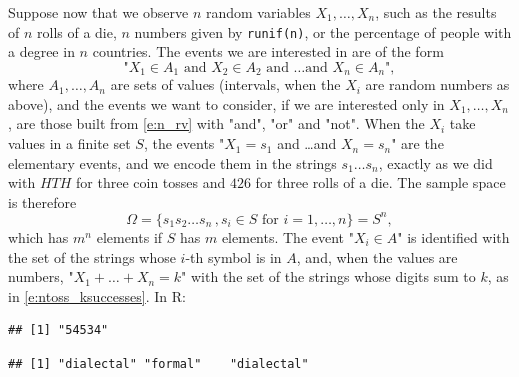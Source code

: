 \begin{model}
	\label{ex:n_rv}
	Suppose now that we observe $n$ random variables $X_1, \ldots, X_n$, such as the results of $n$ rolls of a die, $n$ numbers given by \texttt{runif(n)}, or the percentage of people with a degree in $n$ countries. The events we are interested in are of the form 
	\begin{equation}
		\label{e:n_rv}
		\text{"$X_1 \in A_1$ and $X_2 \in A_2$ and \ldots and $X_n \in A_n$"}, 
	\end{equation}
	where $A_1, \ldots, A_n$ are sets of values (intervals, when the $X_i$ are random numbers as above), and the events we want to consider, if we are interested only in $X_1, \ldots, X_n$, are those built from \eqref{e:n_rv} with "and", "or" and "not". 
	When the $X_i$ take values in a finite set $S$, the events "$X_1 = s_1$ and \ldots and $X_n = s_n$" are the elementary events, and we encode them in the strings $s_1 \ldots s_n$, exactly as we did with $HTH$ for three coin tosses and $426$ for three rolls of a die. The sample space is therefore 
	\begin{equation}
		\label{e:n_rv_strings}
		\Omega = \{ s_1 s_2 \ldots s_n \,, s_i \in S \text{ for $i = 1, \ldots, n$} \} = S^n, 
	\end{equation}
	which has $m^n$ elements if $S$ has $m$ elements. The event "$X_i \in A$" is identified with the set of the strings whose $i$-th symbol is in $A$, and, when the values are numbers, "$X_1 + \ldots + X_n = k$" with the set of the strings whose digits sum to $k$, as in \eqref{e:ntoss_ksuccesses}. In R: 
\begin{knitrout}
\color{fgcolor}\begin{kframe}
\begin{alltt}
 \hlkwb{<-} \hldef{(}\hlopt{:}\hldef{,} \hldef{,}  \hldef{=} \hldef{)}                   
  \hldef{=} \hldef{)}                               
\end{alltt}
\begin{verbatim}
## [1] "54534"
\end{verbatim}
\begin{alltt}
\hldef{(}\hldef{(}\hldef{,} \hldef{),} \hldef{,}  \hldef{=} \hldef{)}   
\end{alltt}
\begin{verbatim}
## [1] "dialectal" "formal"    "dialectal"
\end{verbatim}
\end{kframe}
\end{knitrout}
\end{model}

